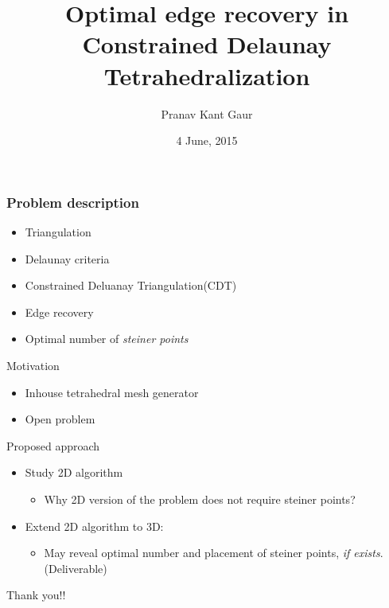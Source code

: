 \documentclass{beamer}
\title[Optimal edge recovery in CDT]{Optimal edge recovery in Constrained Delaunay Tetrahedralization}
\author{Pranav Kant Gaur}
\institute[Computer Division]{Computer graphics and Visualization section, \newline Computer Division}
\date{4 June, 2015}
\begin{document}
\begin{frame}
\titlepage
\end{frame}


\begin{frame}
\frametitle{Problem description}
\begin{itemize}
\item Triangulation
\item Delaunay criteria
\item Constrained Deluanay Triangulation(CDT)
\item Edge recovery
\item Optimal number of \textit{steiner points}
\end{itemize}
\end{frame}

\begin{frame}{Motivation}
\begin{itemize}
\item Inhouse tetrahedral mesh generator
\item Open problem 	
\end{itemize}		
\end{frame}

\begin{frame}{Proposed approach}
\begin{itemize}
\item Study 2D algorithm
	\begin{itemize}	
            \item Why 2D version of the problem does not require steiner points?
	\end{itemize}
\item Extend 2D algorithm to 3D:
	\begin{itemize}
		\item May reveal optimal number and placement of steiner points, \textit{if exists}.\color{red}({Deliverable})
	\end{itemize}		
\end{itemize}
\end{frame}

\begin{frame}
Thank you!!
\end{frame}
\end{document}
